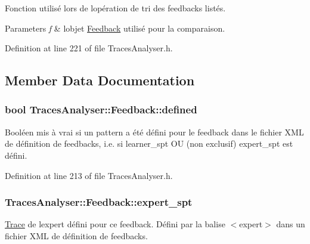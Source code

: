 Fonction utilisé lors de l\textquotesingle{}opération de tri des feedbacks listés. 


\begin{DoxyParams}{Parameters}
{\em f} & l\textquotesingle{}objet \hyperlink{struct_traces_analyser_1_1_feedback}{Feedback} utilisé pour la comparaison. \\
\hline
\end{DoxyParams}


Definition at line 221 of file Traces\+Analyser.\+h.



\subsection{Member Data Documentation}
\subsubsection[{\texorpdfstring{defined}{defined}}]{\setlength{\rightskip}{0pt plus 5cm}bool Traces\+Analyser\+::\+Feedback\+::defined}\hypertarget{struct_traces_analyser_1_1_feedback_a3d84d2d22c4639d2c04789c054120c27}{}\label{struct_traces_analyser_1_1_feedback_a3d84d2d22c4639d2c04789c054120c27}
Booléen mis à vrai si un pattern a été défini pour le feedback dans le fichier X\+ML de définition de feedbacks, i.\+e. si learner\+\_\+spt OU (non exclusif) expert\+\_\+spt est défini. 

Definition at line 213 of file Traces\+Analyser.\+h.

\subsubsection[{\texorpdfstring{expert\+\_\+spt}{expert_spt}}]{ Traces\+Analyser\+::\+Feedback\+::expert\+\_\+spt}\hypertarget{struct_traces_analyser_1_1_feedback_ab0783087941c78c1ac592a1e284d4396}{}\label{struct_traces_analyser_1_1_feedback_ab0783087941c78c1ac592a1e284d4396}
\hyperlink{class_trace}{Trace} de l\textquotesingle{}expert défini pour ce feedback. Défini par la balise $<$expert$>$ dans un fichier X\+ML de définition de feedbacks. 

